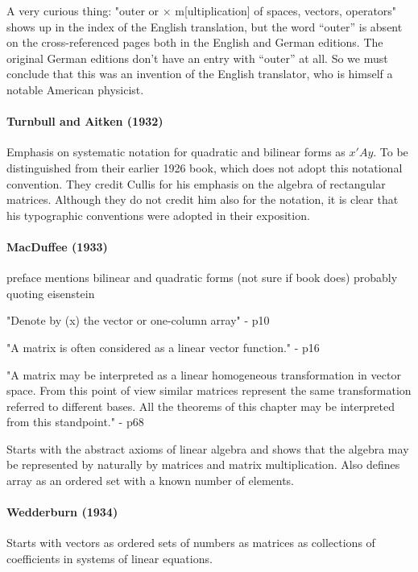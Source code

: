 A very curious thing: "outer or $\times$ m[ultiplication] of spaces, vectors, operators" shows up in the index of the English translation, but the word ``outer'' is absent on the cross-referenced pages both in the English and German editions. The original German editions don't have an entry with ``outer'' at all. So we must conclude that this was an invention of the English translator, who is himself a notable American physicist.


\paragraph{Turnbull and Aitken (1932)}

Emphasis on systematic notation for quadratic and bilinear forms as $x'Ay$.
To be distinguished from their earlier 1926 book, which does not adopt this notational convention.
They credit Cullis for his emphasis on the algebra of rectangular matrices. Although they do not credit him also for the notation, it is clear that his typographic conventions were adopted in their exposition.



\paragraph{MacDuffee (1933)~\cite{MacDuffee1933}}

preface mentions bilinear and quadratic forms (not sure if book does)
probably quoting eisenstein

"Denote by (x) the vector or one-column array" - p10

"A matrix is often considered as a linear vector function." - p16

"A matrix may be interpreted as a linear homogeneous transformation in
vector space. From this point of view similar matrices represent the
same transformation referred to different bases. All the theorems of
this chapter may be interpreted from this standpoint." - p68

Starts with the abstract axioms of linear algebra and shows that the algebra may be represented by naturally by matrices and matrix multiplication. Also defines array as an ordered set with a known number of elements.

\paragraph{Wedderburn (1934)~\cite{Wedderburn1934}}

Starts with vectors as ordered sets of numbers as matrices as collections of coefficients in systems of linear equations.

